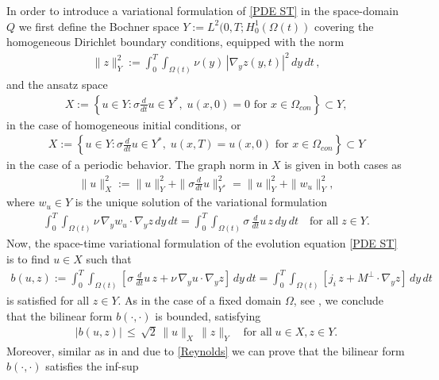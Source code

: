 \documentclass[12pt]{article}
\numberwithin{equation}{section}
\begin{document}
In order to introduce a variational formulation of \eqref{PDE ST} in the
space-domain $Q$ we first define the Bochner space
$Y:=L^2(0,T;H^1_0(\Omega(t))$ covering the homogeneous Dirichlet
boundary conditions, equipped with the norm
\begin{align*}
  \| z \|_Y^2 := \int_0^T \int_{\Omega(t)} \nu(y) \,
  |\nabla_y z(y,t)|^2 \, dy \, dt \, ,
\end{align*}
and the ansatz space
\begin{align*}
  X := \left \{ u \in Y : \sigma \frac{d}{dt}u \in Y^*, \;
  u(x,0) = 0 \text{ for } x \in \Omega_{con} \right\} \subset Y,
\end{align*}
in the case of homogeneous initial conditions, or
\begin{align*}
  X := \left \{ u \in Y : \sigma \frac{d}{dt}u \in Y^*, \;
  u(x,T) = u(x,0) \text{ for } x \in \Omega_{con} \right\} \subset Y
\end{align*}
in the case of a periodic behavior.
The graph norm in $X$ is given in both cases as
\begin{align*}
  \| u \|_X^2 := \| u \|_Y^2 + \| \sigma \frac{d}{dt} u \|_{Y^*}^2 =
  \| u \|^2_Y + \| w_u \|^2_Y,
\end{align*}
where $w_u \in Y$ is the unique solution of the variational formulation
\begin{align}\label{eqn:auxiliary_variational_form}
  \int_0^T \int_{\Omega(t)} \nu \, \nabla_y w_u \cdot \nabla_y z \, dy \, dt
  =
  \int_0^T \int_{\Omega(t)} \sigma \, \frac{d}{dt}u \, z \, dy \ dt \quad
  \mbox{for all} \; z \in Y.
\end{align}
Now, the space-time variational formulation of the evolution equation
\eqref{PDE ST} is to find $u \in X$ such that
\begin{align}\label{eqn:variational_form}
  b(u,z) := \int_0^T \int_{\Omega(t)} \left[ \sigma \, \frac{d}{dt}u \, z
  + \nu \, \nabla_y u \cdot \nabla_y z \right] \, dy \, dt =
  \int_0^T \int_{\Omega(t)} \left[ j_i \, z + M^\perp \cdot \nabla_y z \right]
  \, dy \, dt
\end{align}
is satisfied for all $z \in Y$. As in the case of a fixed domain $\Omega$,
see \cite{St15}, we conclude that the bilinear form $b(\cdot,\cdot)$
is bounded, satisfying
\begin{align*}
  |b(u,z)| \, \leq \, \sqrt{2} \, \|u\|_X \, \|z\|_Y \quad
  \mbox{for all} \; u \in X, z \in Y .
\end{align*}
Moreover, similar as in \cite{St15} and due to \eqref{Reynolds} we can
prove that the bilinear form $b(\cdot,\cdot)$ satisfies the inf-sup
\end{document}
